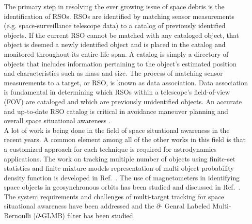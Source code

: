 \documentclass[]{aiaa-tc}%
\begin{document}
The primary step in resolving the ever growing issue of space debris is the identification
of RSOs. RSOs are identified by matching sensor measurements (e.g. space-surveillance telescope
data) to a catalog of previously identified objects. If the current RSO cannot be matched with any
cataloged object, that object is deemed a newly identified object and is placed in the catalog and
monitored throughout its entire life span. A catalog is simply a directory of objects that includes
information pertaining to the object's estimated position and characteristics such as mass and size.
The process of matching sensor measurements to a target, or RSO, is known as data association.
Data association is fundamental in determining which RSOs within a telescope's field-of-view (FOV)
are cataloged and which are previously unidentified objects. An accurate and up-to-date RSO catalog
is critical in avoidance maneuver planning and overall space situational awareness \cite{Silversmith}.\\

A lot of work is being done in the field of space situational awareness in the recent years. A common element among all of the other works in this field is that a customized approach for
each technique is required for astrodynamics applications. The work on tracking multiple number of objects using finite-set statistics and finite mixture models representation of multi object probability density function is developed in Ref.~. The use of magnetometers in identifying space objects in geosynchronous orbits has been studied and discussed in Ref.~. The system requirements and challenges of multi-target tracking for space situational awareness have been addressed and the $\partial$- Genral Labeled Multi-Bernoulli ($\partial$-GLMB) filter has been studied.\\
\end{document}
